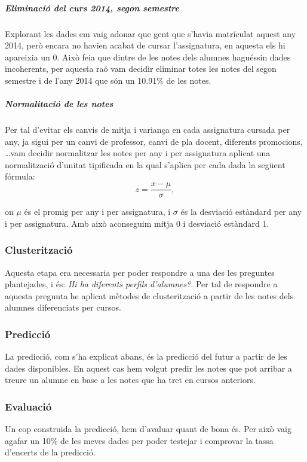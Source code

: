 \documentclass[12pt,a4paper,catalan]{article}
\begin{document}
\subparagraph{Eliminació del curs 2014, segon semestre}
Explorant les dades em vaig adonar que gent que s'havia matrículat aquest any 2014, però encara no havien acabat de cursar l'assignatura, en aquesta els hi apareixia un 0. Això feia que dintre de les notes dels alumnes haguéssin dades incoherents, per aquesta raó vam decidir eliminar totes les notes del segon semestre i de l'any 2014  que són un 10.91\% de les notes.


\subparagraph{Normalitació de les notes}
Per tal d'evitar els canvis de mitja i variança en cada assignatura cursada per any, ja sigui per un canvi de professor, canvi de pla docent, diferents promocions, \ldots vam decidir normalitzar les notes per any i per assignatura aplicat una normalització d'unitat tipificada en la qual s'aplica per cada dada la següent fórmula:
$$ z = \frac{x - \mu}{\sigma}, $$

on $\mu$ és el promig per any i per assignatura, i $\sigma$ és la desviació estàndard per any i per assignatura. Amb això aconseguim mitja 0 i desviació estàndard 1.

\subsubsection{Clusterització}
Aquesta etapa era necessaria per poder respondre a una des les preguntes plantejades, i és: \textit{Hi ha diferents perfils d'alumnes?}. Per tal de  respondre a aquesta pregunta he aplicat mètodes de clusterització a partir de les notes dels alumnes diferenciats per cursos.

\subsubsection{Predicció}
La predicció, com s'ha explicat abans, és la predicció del futur a partir de les dades disponibles. En aquest cas hem volgut predir les notes que pot arribar a treure un alumne en base a les notes que ha tret en cursos anteriors.

\subsubsection{Evaluació}
Un cop construida la predicció, hem d'avaluar quant de bona és. Per això vaig agafar un 10\% de les meves dades per poder testejar i comprovar la tassa d'encerts de la predicció.

\newpage
\end{document}
